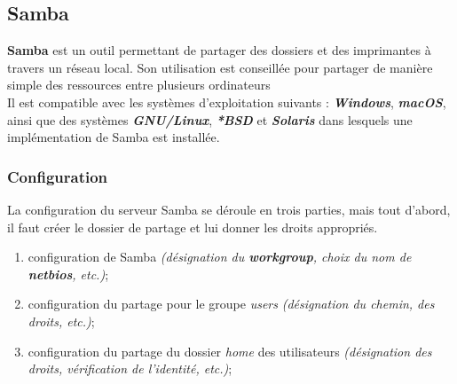 \subsection{Samba}
\label{subsec:samba}

\textbf{Samba} est un outil permettant de partager des dossiers et des
imprimantes à travers un réseau local. Son utilisation est conseillée pour
partager de manière simple des ressources entre plusieurs ordinateurs  \\
Il est compatible avec les systèmes d'exploitation suivants :
\textit{\textbf{Windows}}, \textit{\textbf{macOS}}, ainsi que des systèmes \textit{\textbf{GNU/Linux}},
\textit{\textbf{*BSD}} et \textit{\textbf{Solaris}} dans lesquels une implémentation de Samba est
installée.


\subsubsection{Configuration}
\label{subsubsec:configuration}

La configuration du serveur Samba se déroule en trois parties, mais tout d'abord,
il faut créer le dossier de partage et lui donner les droits appropriés. \\

\begin{enumerate}

    \item configuration de Samba \textit{(désignation du \textbf{workgroup},
    choix du nom de \textbf{netbios}, etc.)};
    \item configuration du partage pour le groupe \og \textit{users} \fg
    \textit{(désignation du chemin, des droits, etc.)};
    \item configuration du partage du dossier \og \textit{home} \fg des utilisateurs
    \textit{(désignation des droits, vérification de l'identité, etc.)};

\end{enumerate}


